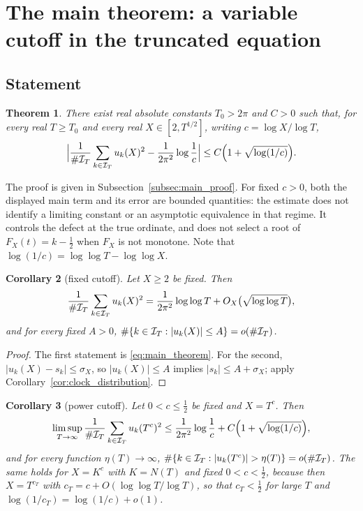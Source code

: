 \documentclass[11pt,reqno]{amsart}
\theoremstyle{plain}\newtheorem{theorem}{Theorem}[section]\newtheorem{proposition}[theorem]{Proposition}\newtheorem{lemma}[theorem]{Lemma}\newtheorem{corollary}[theorem]{Corollary}
\theoremstyle{definition}\newtheorem{hypothesis}[theorem]{Hypothesis}\newtheorem{definition}[theorem]{Definition}
\theoremstyle{remark}\newtheorem{remark}[theorem]{Remark}\newtheorem{experiment}[theorem]{Experiment}\newtheorem{question}[theorem]{Question}\newtheorem{heuristic}[theorem]{Heuristic}\newtheorem{conjecture}[theorem]{Conjecture}
\begin{document}
\section{The main theorem: a variable cutoff in the truncated equation}
\label{sec:main_theorem}

\subsection{Statement}
\label{subsec:main_statement}

\begin{theorem}\label{thm:main}
There exist real absolute constants $T_0>2\pi$ and $C>0$ such that, for every real $T\ge T_0$ and every real $X\in[2,T^{1/2}]$, writing $c=\log X/\log T$,
\begin{equation}
\Bigl|\frac1{\#\mathcal I_T}\sum_{k\in\mathcal I_T}u_k(X)^2-\frac1{2\pi^2}\log\frac1c\Bigr|\le C\Bigl(1+\sqrt{\log(1/c)}\Bigr).
\label{eq:main_theorem}
\end{equation}
\end{theorem}

The proof is given in Subsection~\ref{subsec:main_proof}. For fixed $c>0$, both the displayed main term and its error are bounded quantities: the estimate does not identify a limiting constant or an asymptotic equivalence in that regime. It controls the defect at the true ordinate, and does not select a root of $F_X(t)=k-\frac12$ when $F_X$ is not monotone. Note that $\log(1/c)=\log\log T-\log\log X$.

\begin{corollary}[fixed cutoff]\label{cor:fixed_cutoff}
Let $X\ge2$ be fixed. Then
\begin{equation}
\frac1{\#\mathcal I_T}\sum_{k\in\mathcal I_T}u_k(X)^2=\frac1{2\pi^2}\log\log T+O_X\bigl(\sqrt{\log\log T}\bigr),
\label{eq:fixed_cutoff}
\end{equation}
and for every fixed $A>0$, $\#\{k\in\mathcal I_T:|u_k(X)|\le A\}=o(\#\mathcal I_T)$.
\end{corollary}

\begin{proof}
The first statement is \eqref{eq:main_theorem}. For the second, $|u_k(X)-s_k|\le\sigma_X$, so $|u_k(X)|\le A$ implies $|s_k|\le A+\sigma_X$; apply Corollary~\ref{cor:clock_distribution}.
\end{proof}

\begin{corollary}[power cutoff]\label{cor:power_cutoff}
Let $0<c\le\frac12$ be fixed and $X=T^c$. Then
\begin{equation}
\limsup_{T\to\infty}\frac1{\#\mathcal I_T}\sum_{k\in\mathcal I_T}u_k(T^c)^2\le\frac1{2\pi^2}\log\frac1c+C\Bigl(1+\sqrt{\log(1/c)}\Bigr),
\label{eq:power_cutoff}
\end{equation}
and for every function $\eta(T)\to\infty$, $\#\{k\in\IT:|u_k(T^c)|>\eta(T)\}=o(\#\IT)$. The same holds for $X=K^c$ with $K=N(T)$ and fixed $0<c<\frac12$, because then $X=T^{c_T}$ with $c_T=c+O(\log\log T/\log T)$, so that $c_T<\frac12$ for large $T$ and $\log(1/c_T)=\log(1/c)+o(1)$.
\end{corollary}
\end{document}
